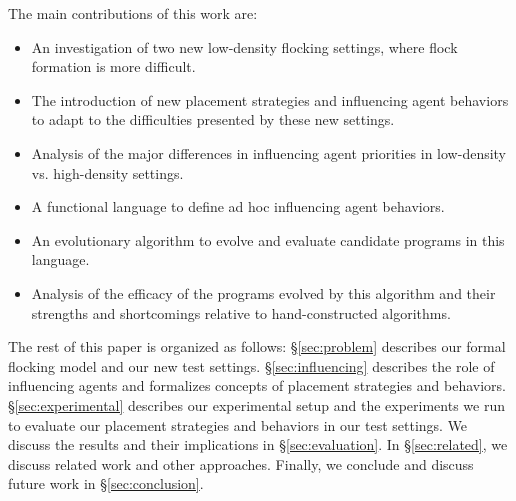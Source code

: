 The main contributions of this work are:
\begin{itemize}
    \item An investigation of two new low-density flocking settings, where
    flock formation is more difficult.
    \item The introduction of new placement strategies and influencing agent
    behaviors to adapt to the difficulties presented by these new settings.
    \item Analysis of the major differences in influencing agent priorities in
    low-density vs. high-density settings.
    \item A functional language to define ad hoc influencing agent behaviors.
    \item An evolutionary algorithm to evolve and evaluate candidate programs in
    this language.
    \item Analysis of the efficacy of the programs evolved by this algorithm and
    their strengths and shortcomings relative to hand-constructed algorithms.
\end{itemize}

The rest of this paper is organized as follows: \S\ref{sec:problem} describes 
our formal flocking model and our new test settings. \S\ref{sec:influencing} 
describes the role of influencing agents and formalizes concepts of placement 
strategies and behaviors.
\S\ref{sec:experimental} describes our experimental setup and the experiments 
we run to evaluate our placement strategies and behaviors in our test settings.
We discuss the results and their implications in \S\ref{sec:evaluation}.
In \S\ref{sec:related}, we discuss related work and other approaches.
Finally, we conclude and discuss future work in \S\ref{sec:conclusion}.

